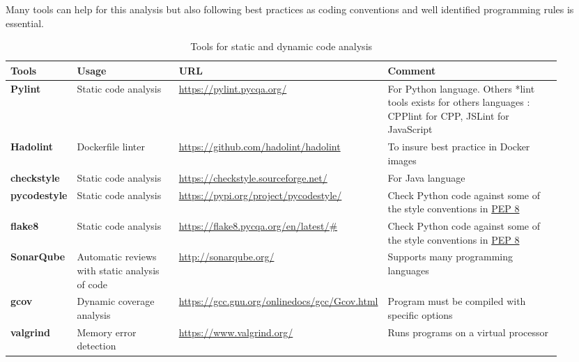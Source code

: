 Many tools can help for this analysis but also following best
practices as coding conventions and well identified programming rules
is essential.

\begin{center}
\begin{table}

  \label{tab:tools_pack}
  \small
  \begin{tabular}{|p{0.12\linewidth}|p{0.2\linewidth}|p{0.25\linewidth}|p{0.35\linewidth}|} \hline

    \textbf{Tools} & \textbf{Usage} & \textbf{URL} & \textbf{Comment} \\ \hline \hline
    \textbf{Pylint} & Static code analysis & \url{https://pylint.pycqa.org/}
    & For Python language. Others *lint tools exists for others
    languages : CPPlint for CPP, JSLint for JavaScript \\ \hline
    \textbf{Hadolint} & Dockerfile linter & \url{https://github.com/hadolint/hadolint}
    & To insure best practice in Docker images \\ \hline
    \textbf{checkstyle} & Static code analysis & \url{https://checkstyle.sourceforge.net/}
    & For Java language  \\ \hline
    \textbf{pycodestyle} & Static code analysis & \url{https://pypi.org/project/pycodestyle/}
    & Check Python code against some of the style conventions in \href{http://www.python.org/dev/peps/pep-0008/}{PEP 8}  \\ \hline
    \textbf{flake8} & Static code analysis & \url{https://flake8.pycqa.org/en/latest/#}
    & Check Python code against some of the style conventions in \href{http://www.python.org/dev/peps/pep-0008/}{PEP 8} \\ \hline
    \textbf{SonarQube} & Automatic reviews with static analysis of code & \url{http://sonarqube.org/}
    & Supports many programming languages  \\ \hline
    \textbf{gcov} & Dynamic coverage analysis & \url{https://gcc.gnu.org/onlinedocs/gcc/Gcov.html}
    & Program must be compiled with specific options  \\ \hline
    \textbf{valgrind} & Memory error detection & \url{https://www.valgrind.org/}
    & Runs programs on a virtual processor  \\ \hline

  \end{tabular}
  \caption{Tools for static and dynamic code analysis}
\end{table}
\end{center}


